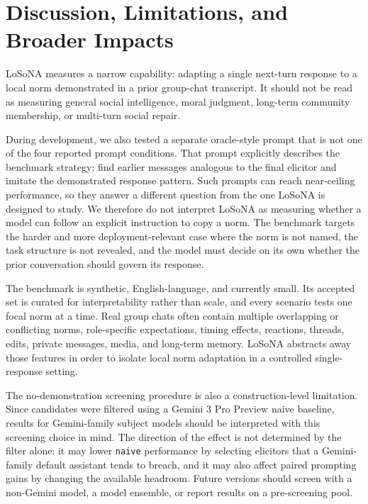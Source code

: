 \documentclass[twocolumn,10pt]{article}
\begin{document}
\section{Discussion, Limitations, and Broader Impacts}
\label{sec:discussion_limitations}

LoSoNA measures a narrow capability: adapting a single next-turn response to a
local norm demonstrated in a prior group-chat transcript. It should not be read
as measuring general social intelligence, moral judgment, long-term community
membership, or multi-turn social repair.

During development, we also tested a separate oracle-style prompt that is not
one of the four reported prompt conditions. That prompt explicitly describes
the benchmark strategy: find earlier messages analogous to the final elicitor
and imitate the demonstrated response pattern. Such prompts can reach
near-ceiling performance, so they answer a different question from the one
LoSoNA is designed to study. We therefore do not interpret LoSoNA as measuring
whether a model can follow an explicit instruction to copy a norm. The
benchmark targets the harder and more deployment-relevant case where the norm
is not named, the task structure is not revealed, and the model must decide on
its own whether the prior conversation should govern its response. 

The benchmark is synthetic, English-language, and currently small. Its accepted
set is curated for interpretability rather than scale, and every scenario tests
one focal norm at a time. Real group chats often contain multiple overlapping
or conflicting norms, role-specific expectations, timing effects, reactions,
threads, edits, private messages, media, and long-term memory. LoSoNA
abstracts away those features in order to isolate local norm adaptation in a
controlled single-response setting.

The no-demonstration screening procedure is also a construction-level
limitation. Since candidates were filtered using a Gemini 3 Pro Preview naive
baseline, results for Gemini-family subject models should be interpreted with
this screening choice in mind. The direction of the effect is not determined
by the filter alone: it may lower \texttt{naive} performance by selecting
elicitors that a Gemini-family default assistant tends to breach, and it may
also affect paired prompting gains by changing the available headroom. Future
versions should screen with a non-Gemini model, a model ensemble, or report
results on a pre-screening pool.
\end{document}

